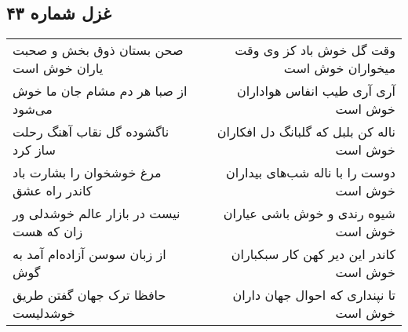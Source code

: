 \begin{center}
\section*{غزل شماره ۴۳}
\label{sec:sh043}
\begin{longtable}{l p{0.5cm} r}
صحن بستان ذوق بخش و صحبت یاران خوش است
&&
وقت گل خوش باد کز وی وقت میخواران خوش است
\\
از صبا هر دم مشام جان ما خوش می‌شود
&&
آری آری طیب انفاس هواداران خوش است
\\
ناگشوده گل نقاب آهنگ رحلت ساز کرد
&&
ناله کن بلبل که گلبانگ دل افکاران خوش است
\\
مرغ خوشخوان را بشارت باد کاندر راه عشق
&&
دوست را با ناله شب‌های بیداران خوش است
\\
نیست در بازار عالم خوشدلی ور زان که هست
&&
شیوه رندی و خوش باشی عیاران خوش است
\\
از زبان سوسن آزاده‌ام آمد به گوش
&&
کاندر این دیر کهن کار سبکباران خوش است
\\
حافظا ترک جهان گفتن طریق خوشدلیست
&&
تا نپنداری که احوال جهان داران خوش است
\\
\end{longtable}
\end{center}
